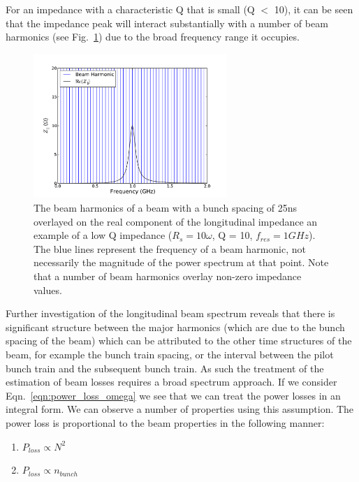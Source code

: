 For an impedance with a characteristic Q that is small (Q $<$ 10), it can be seen that the impedance peak will interact substantially with a number of beam harmonics (see Fig.~\ref{fig:low_q_harmonics}) due to the broad frequency range it occupies.

\begin{figure}
\begin{center}
\includegraphics[width=0.65\textwidth]{Wakefields_and_Impedances/figures/low_q_10_resonance_beam_harmonics.pdf}
\end{center}
\caption{The beam harmonics of a beam with a bunch spacing of 25ns overlayed on the real component of the longitudinal impedance an example of a low Q impedance ($R_{s}=10\omega$, Q = 10, $f_{res}=1GHz$). The blue lines represent the frequency of a beam harmonic, not necessarily the magnitude of the power spectrum at that point. Note that a number of beam harmonics overlay non-zero impedance values.}
\label{fig:low_q_harmonics}
\end{figure}

Further investigation of the longitudinal beam spectrum reveals that there is significant structure between the major harmonics (which are due to the bunch spacing of the beam) which can be attributed to the other time structures of the beam, for example the bunch train spacing, or the interval between the pilot bunch train and the subsequent bunch train. As such the treatment of the estimation of beam losses requires a broad spectrum approach. If we consider Eqn.~\ref{eqn:power_loss_omega} we see that we can treat the power losses in an integral form. We can observe a number of properties using this assumption. The power loss is proportional to the beam properties in the following manner:

\begin{enumerate}
\item{$P_{loss} \propto N^{2}$}
\item{$P_{loss} \propto n_{bunch}$}
\end{enumerate}


